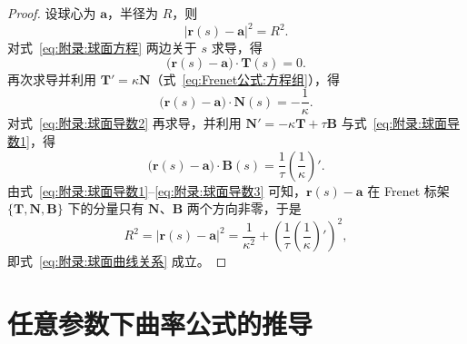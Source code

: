 \begin{proof}
	设球心为 $\boldsymbol{a}$，半径为 $R$，则
	\begin{equation}
		\left|\boldsymbol{r}(s)-\boldsymbol{a}\right|^{2}=R^{2}.
		\label{eq:附录:球面方程}
	\end{equation}
	对式~\eqref{eq:附录:球面方程} 两边关于 $s$ 求导，得
	\begin{equation}
		\bigl(\boldsymbol{r}(s)-\boldsymbol{a}\bigr)\cdot\mathbf{T}(s)=0.
		\label{eq:附录:球面导数1}
	\end{equation}
	再次求导并利用 $\mathbf{T}'=\kappa\mathbf{N}$（式~\eqref{eq:Frenet公式:方程组}），得
	\begin{equation}
		\bigl(\boldsymbol{r}(s)-\boldsymbol{a}\bigr)\cdot\mathbf{N}(s)=-\frac{1}{\kappa}.
		\label{eq:附录:球面导数2}
	\end{equation}
	对式~\eqref{eq:附录:球面导数2} 再求导，并利用 $\mathbf{N}'=-\kappa\mathbf{T}+\tau\mathbf{B}$ 与式~\eqref{eq:附录:球面导数1}，得
	\begin{equation}
		\bigl(\boldsymbol{r}(s)-\boldsymbol{a}\bigr)\cdot\mathbf{B}(s)=\frac{1}{\tau}\left(\frac{1}{\kappa}\right)'.
		\label{eq:附录:球面导数3}
	\end{equation}
	由式~\eqref{eq:附录:球面导数1}--\eqref{eq:附录:球面导数3} 可知，$\boldsymbol{r}(s)-\boldsymbol{a}$ 在 Frenet 标架 $\{\mathbf{T},\mathbf{N},\mathbf{B}\}$ 下的分量只有 $\mathbf{N}$、$\mathbf{B}$ 两个方向非零，于是
	\begin{equation}
		R^{2}=\left|\boldsymbol{r}(s)-\boldsymbol{a}\right|^{2}
		=\frac{1}{\kappa^{2}}+\left(\frac{1}{\tau}\left(\frac{1}{\kappa}\right)'\right)^{2},
		\label{eq:附录:球面关系推导}
	\end{equation}
	即式~\eqref{eq:附录:球面曲线关系} 成立。
\end{proof}

\section{任意参数下曲率公式的推导}


